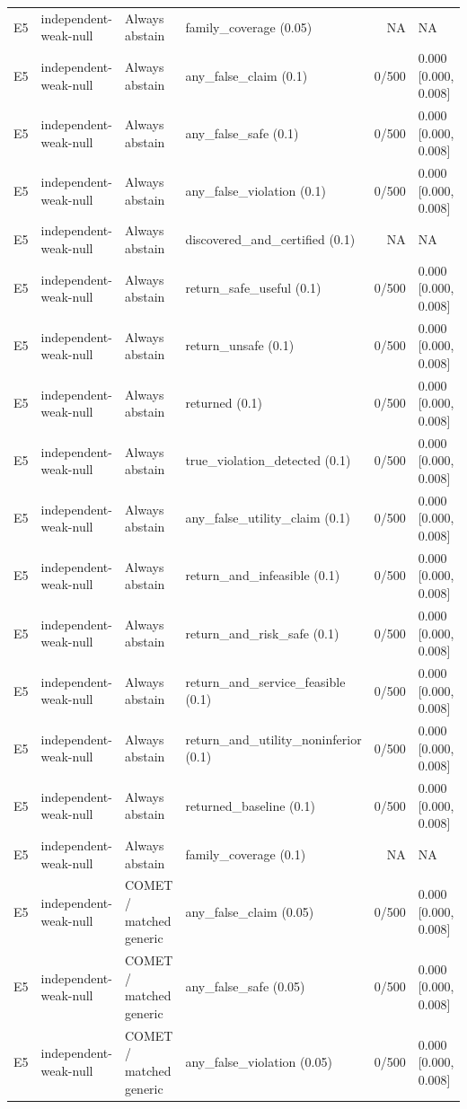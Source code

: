 \begin{longtable}{p{.04\linewidth}p{.18\linewidth}p{.19\linewidth}p{.16\linewidth}r p{.21\linewidth}}
E5 & independent-weak-null & Always abstain & family\_coverage (0.05) & NA & NA\\
E5 & independent-weak-null & Always abstain & any\_false\_claim (0.1) & 0/500 & 0.000 [0.000, 0.008]\\
E5 & independent-weak-null & Always abstain & any\_false\_safe (0.1) & 0/500 & 0.000 [0.000, 0.008]\\
E5 & independent-weak-null & Always abstain & any\_false\_violation (0.1) & 0/500 & 0.000 [0.000, 0.008]\\
E5 & independent-weak-null & Always abstain & discovered\_and\_certified (0.1) & NA & NA\\
E5 & independent-weak-null & Always abstain & return\_safe\_useful (0.1) & 0/500 & 0.000 [0.000, 0.008]\\
E5 & independent-weak-null & Always abstain & return\_unsafe (0.1) & 0/500 & 0.000 [0.000, 0.008]\\
E5 & independent-weak-null & Always abstain & returned (0.1) & 0/500 & 0.000 [0.000, 0.008]\\
E5 & independent-weak-null & Always abstain & true\_violation\_detected (0.1) & 0/500 & 0.000 [0.000, 0.008]\\
E5 & independent-weak-null & Always abstain & any\_false\_utility\_claim (0.1) & 0/500 & 0.000 [0.000, 0.008]\\
E5 & independent-weak-null & Always abstain & return\_and\_infeasible (0.1) & 0/500 & 0.000 [0.000, 0.008]\\
E5 & independent-weak-null & Always abstain & return\_and\_risk\_safe (0.1) & 0/500 & 0.000 [0.000, 0.008]\\
E5 & independent-weak-null & Always abstain & return\_and\_service\_feasible (0.1) & 0/500 & 0.000 [0.000, 0.008]\\
E5 & independent-weak-null & Always abstain & return\_and\_utility\_noninferior (0.1) & 0/500 & 0.000 [0.000, 0.008]\\
E5 & independent-weak-null & Always abstain & returned\_baseline (0.1) & 0/500 & 0.000 [0.000, 0.008]\\
E5 & independent-weak-null & Always abstain & family\_coverage (0.1) & NA & NA\\
E5 & independent-weak-null & COMET / matched generic & any\_false\_claim (0.05) & 0/500 & 0.000 [0.000, 0.008]\\
E5 & independent-weak-null & COMET / matched generic & any\_false\_safe (0.05) & 0/500 & 0.000 [0.000, 0.008]\\
E5 & independent-weak-null & COMET / matched generic & any\_false\_violation (0.05) & 0/500 & 0.000 [0.000, 0.008]\\

\end{longtable}
